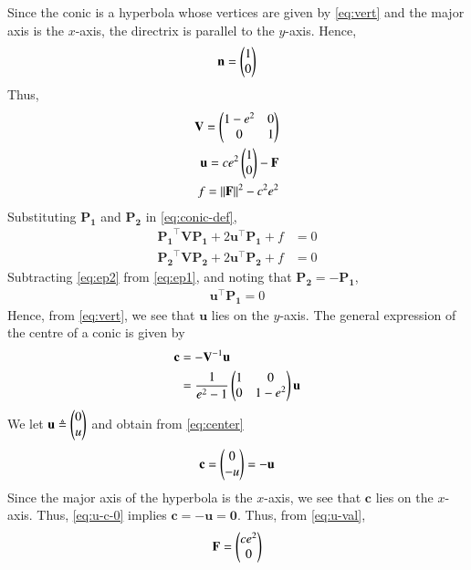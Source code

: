 \documentclass[journal,12pt,twocolumn]{IEEEtran}
\renewcommand{\vec}[1]{\boldsymbol{\mathbf{#1}}}
\begin{document}
\begin{enumerate}
    Since the conic is a hyperbola whose vertices are given by \eqref{eq:vert}
    and the major axis is the $x$-axis, the directrix is parallel to the $y$-axis.
    Hence,
    \begin{align}
        \vec{n} = \myvec{1\\0}
    \end{align}
    Thus,
    \begin{align}
        \vec{V} = \myvec{1-e^2&0\\0&1} \label{eq:V-val} \\
        \vec{u} = ce^2\myvec{1\\0} - \vec{F} \label{eq:u-val} \\
        f = \norm{\vec{F}}^2 - c^2e^2 \label{eq:f-val}
    \end{align}
    Substituting $\vec{P_1}$ and $\vec{P_2}$ in \eqref{eq:conic-def},
    \begin{align}
        \vec{P_1}^\top\vec{VP_1} + 2\vec{u}^\top\vec{P_1} + f &= 0 \label{eq:ep1} \\
        \vec{P_2}^\top\vec{VP_2} + 2\vec{u}^\top\vec{P_2} + f &= 0 \label{eq:ep2}
    \end{align}
    Subtracting \eqref{eq:ep2} from \eqref{eq:ep1}, and noting that $\vec{P_2} = -\vec{P_1}$,
    \begin{align}
        \vec{u}^\top\vec{P_1} = 0
        \label{eq:u-exp}
    \end{align}
    Hence, from \eqref{eq:vert}, we see that $\vec{u}$ lies on the $y$-axis.
    The general expression of the centre of a conic is given by
    \begin{align}
        \vec{c} &= -\vec{V}^{-1}\vec{u} \\
                &= \frac{1}{e^2-1}\myvec{1&0\\0&1-e^2}\vec{u}
        \label{eq:center}
    \end{align}
    We let $\vec{u} \triangleq \myvec{0\\u}$ and obtain from \eqref{eq:center}
    \begin{align}
        \vec{c} = \myvec{0\\-u} = -\vec{u}
        \label{eq:u-c-0}
    \end{align}
    Since the major axis of the hyperbola is the $x$-axis, we see that $\vec{c}$
    lies on the $x$-axis. Thus, \eqref{eq:u-c-0} implies $\vec{c} = -\vec{u} 
    = \vec{0}$. Thus, from \eqref{eq:u-val},
    \begin{align}
        \vec{F} = \myvec{ce^2\\0}

\end{align}
\end{enumerate}
\end{document}
